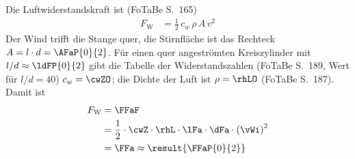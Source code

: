 Die Luftwiderstandskraft ist (FoTaBe S.~165)
\begin{align}
 F_\text{W} &= \frac{1}{2}\,c_w\,\rho\,A\,v^2
\end{align}
Der Wind trifft die Stange quer, die Stirnfläche ist das Rechteck $A = l\cdot d = \AFaP{0}{2}$. Für einen quer angeströmten Kreiszylinder mit $l/d \approx \ldFP{0}{2}$ gibt die Tabelle der Widerstandszahlen (FoTaBe S.~189, Wert für $l/d = 40$) $c_w = \cwZO$; die Dichte der Luft ist $\rho = \rhLO$ (FoTaBe S.~187). Damit ist
\begin{align}
 F_\text{W} &= \FFaF \\
   &= \frac{1}{2}\cdot\cwZ\cdot\rhL\cdot\lFa\cdot\dFa\cdot\left(\vWi\right)^2 \\
   &= \FFa \approx \result{\FFaP{0}{2}}
\end{align}
